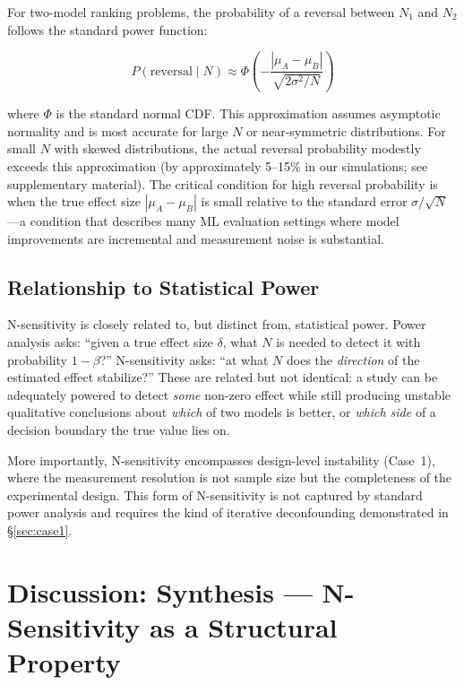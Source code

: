 \documentclass[11pt]{article}
\begin{document}
For two-model ranking problems, the probability of a reversal between $N_1$ and $N_2$ follows the standard power function:

\begin{equation}
P(\text{reversal} \mid N) \approx \Phi\left(-\frac{|\mu_A - \mu_B|}{\sqrt{2\sigma^2/N}}\right)
\label{eq:reversal}
\end{equation}

where $\Phi$ is the standard normal CDF. This approximation assumes asymptotic normality and is most accurate for large $N$ or near-symmetric distributions. For small $N$ with skewed distributions, the actual reversal probability modestly exceeds this approximation (by approximately 5--15\% in our simulations; see supplementary material). The critical condition for high reversal probability is when the true effect size $|\mu_A - \mu_B|$ is small relative to the standard error $\sigma/\sqrt{N}$---a condition that describes many ML evaluation settings where model improvements are incremental and measurement noise is substantial.

\subsection{Relationship to Statistical Power}

N-sensitivity is closely related to, but distinct from, statistical power. Power analysis asks: ``given a true effect size $\delta$, what $N$ is needed to detect it with probability $1-\beta$?'' N-sensitivity asks: ``at what $N$ does the \emph{direction} of the estimated effect stabilize?'' These are related but not identical: a study can be adequately powered to detect \emph{some} non-zero effect while still producing unstable qualitative conclusions about \emph{which} of two models is better, or \emph{which side} of a decision boundary the true value lies on.

More importantly, N-sensitivity encompasses design-level instability (Case~1), where the measurement resolution is not sample size but the completeness of the experimental design. This form of N-sensitivity is not captured by standard power analysis and requires the kind of iterative deconfounding demonstrated in \S\ref{sec:case1}.

\section{Discussion: Synthesis --- N-Sensitivity as a Structural Property}
\label{sec:synthesis}
\end{document}
